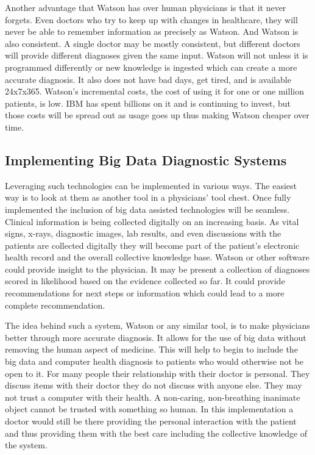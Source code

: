 \documentclass[sigconf]{acmart}
\begin{document}
Another advantage that Watson has over human physicians is that it never 
forgets.  Even doctors who try to keep up with changes in healthcare, they 
will never be able to remember information as precisely as Watson.  And 
Watson is also consistent.  A single doctor may be mostly consistent, but 
different doctors will provide different diagnoses given the same input.  
Watson will not unless it is programmed differently or new knowledge is 
ingested which can create a more accurate diagnosis.  It also does not 
have bad days, get tired, and is available 24x7x365.  Watson's incremental 
costs, the cost of using it for one or one million patients, is low.  IBM 
has spent billions on it and is continuing to invest, but those costs will 
be spread out as usage goes up thus making Watson cheaper over 
time\cite{BusInsider}.

\subsection{Implementing Big Data Diagnostic Systems}
Leveraging such technologies can be implemented in various ways.  The 
easiest way is to look at them as another tool in a physicians' tool chest.  
Once fully implemented the inclusion of big data assisted technologies will 
be seamless.  Clinical information is being collected digitally on an 
increasing basis.  As vital signs, x-rays, diagnostic images, lab results, 
and even discussions with the patients are collected digitally they will 
become part of the patient's electronic health record and the overall 
collective knowledge base.  Watson or other software could provide insight 
to the physician.  It may be present a collection of diagnoses scored in 
likelihood based on the evidence collected so far\cite{ForbesTrust}.  It 
could provide recommendations for next steps or information which could 
lead to a more complete recommendation.

The idea behind such a system, Watson or any similar tool, is to make 
physicians better through more accurate diagnosis.  It allows for the use 
of big data without removing the human aspect of medicine.  This will 
help to begin to include the big data and computer health diagnosis to 
patients who would otherwise not be open to it.  For many people their 
relationship with their doctor is personal.  They discuss items with their 
doctor they do not discuss with anyone else.  They may not trust a 
computer with their health\cite{ForbesTrust}.  A non-caring, non-breathing 
inanimate object cannot be trusted with something so human.  In this 
implementation a doctor would still be there providing the personal 
interaction with the patient and thus providing them with the best care 
including the collective knowledge of the system. 
\end{document}
